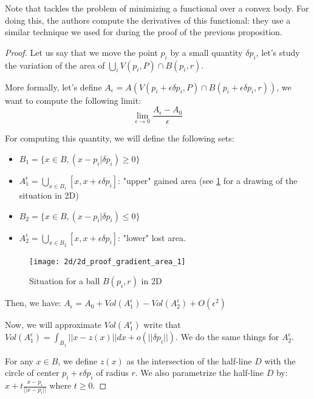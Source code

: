Note that \cite{lachand2005minimizing} tackles the problem of minimizing a
functional over a convex body. For doing this, the authors compute the
derivatives of this functional: they use a similar technique we used for during
the proof of the previous proposition.

\begin{proof}

Let us say that we move the point $ p _i $ by a small quantity $ \delta p_i $,
let's study the variation of the area of $ \bigcup_i V(p_i, P) \cap B(p_i, r) $.

More formally, let's define $ A_{\epsilon} = A(V(p_i + \epsilon \delta p_i, P) \cap
B(p_i + \epsilon \delta p_i, r)) $, we want to compute the following limit:
$$ \lim\limits_{\epsilon \to 0} \frac{A_{\epsilon} - A_0}{\epsilon} $$

For computing this quantity, we will define the following sets:
\begin{itemize}
    \item $ B_1 = \{ x \in B, (x - p_i | \delta p_i) \geq 0\} $
    \item $ A_1^{\epsilon} = \bigcup_{x \in B_1} [x, x + \epsilon \delta p_i] $:
        "upper" gained area (see \ref{fig:demo-gradient} for a drawing of the
        situation in 2D)
    \item $ B_2 = \{ x \in B, (x - p_i | \delta p_i) \leq 0\} $
    \item $ A_2^{\epsilon} = \bigcup_{x \in B_2} [x, x + \epsilon \delta p_i] $:
        "lower" lost area.
\end{itemize}

\begin{figure}[h]
    \centering
    \texttt{[image: 2d/2d\_proof\_gradient\_area\_1]}
    \caption{Situation for a ball $ B(p_i, r) $ in 2D}
    \label{fig:demo-gradient}
\end{figure}

Then, we have: $ A_\epsilon = A_0 + Vol(A_1^\epsilon) - Vol(A_2^\epsilon) +
O(\epsilon^2) $

Now, we will approximate $ Vol(A_1^\epsilon) $ write that $ Vol(A_1^\epsilon) =
\int_{B_1} || x - z(x) || dx + o(||\delta p_i||) $. We do the same things for $
A_2^\epsilon $.

For any $ x \in B $, we define $ z(x) $ as the intersection of the half-line $ D
$ with the circle of center $ p_i + \epsilon \delta p_i $ of radius $ r $. We
also parametrize the half-line $ D $ by: $ x + t \frac{x - p_i}{||x - p_i||} $
where $ t \ge 0 $.


\end{proof}
